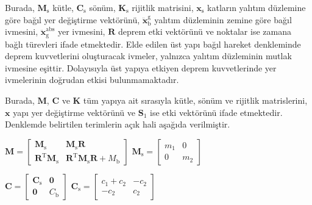 Burada, $\mathbf{M}_{\text{s}}$ kütle, $\mathbf{C}_{\text{s}}$ sönüm,
$\mathbf{K}_{\text{s}}$ rijitlik matrisini, $\mathbf{x}_{\text{s}}$
katların yalıtım düzlemine göre bağıl yer değiştirme vektörünü, $\mathbf{\ddot{x}}_{\text{b}}^{\text{g}}$
yalıtım düzleminin zemine göre bağıl ivmesini, $\mathbf{\ddot{x}}_{\text{g}}^{\text{abs}}$
yer ivmesini, $\mathbf{R}$ deprem etki vektörünü ve noktalar ise
zamana bağlı türevleri ifade etmektedir. Elde edilen üst yapı bağıl
hareket denkleminde deprem kuvvetlerini oluşturacak ivmeler, yalnızca
yalıtım düzleminin mutlak ivmesine eşittir. Dolayısıyla üst yapıya
etkiyen deprem kuvvetlerinde yer ivmelerinin doğrudan etkisi bulunmamaktadır.

Burada, $\mathbf{M}$, $\mathbf{C}$ ve $\mathbf{K}$ tüm yapıya ait
sırasıyla kütle, sönüm ve rijitlik matrislerini, $\mathbf{x}$ yapı
yer değiştirme vektörünü ve $\mathbf{S}_{\text{1}}$ ise etki vektörünü
ifade etmektedir. Denklemde belirtilen terimlerin açık hali aşağıda
verilmiştir. \vspace{0.2cm}

\begin{center}
$\mathbf{M}=\begin{bmatrix}\mathbf{M}_{\text{s}} & \mathbf{M}_{\text{s}}\mathbf{R}\\
\mathbf{R}^{\text{T}}\mathbf{M}_{\text{s}} & \mathbf{R}^{\text{T}}\mathbf{M}_{\text{s}}\mathbf{R}+M_{\text{b}}
\end{bmatrix}$ \hspace{0.2cm} $\mathbf{M}_{\text{s}}=\begin{bmatrix}m_{1} & 0\\
0 & m_{2}
\end{bmatrix}$ \vspace{0.25cm}
\par\end{center}

\begin{center}
$\mathbf{C}=\begin{bmatrix}\mathbf{C}_{\text{s}} & \mathbf{0}\\
\mathbf{0} & C_{\text{b}}
\end{bmatrix}$ \hspace{0.2cm} $\mathbf{C}_{\text{s}}=\begin{bmatrix}c_{1}+c_{2} & -c_{2}\\
-c_{2} & c_{2}
\end{bmatrix}$ \vspace{0.25cm}
\par\end{center}

